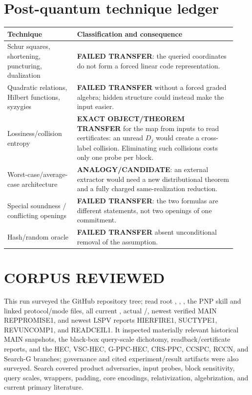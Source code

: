 \documentclass[11pt]{article}
\begin{document}
\section{Post-quantum technique ledger}
\begin{longtable}{p{0.29\linewidth}p{0.64\linewidth}}
\toprule Technique & Classification and consequence\\ \midrule\endhead
Schur squares, shortening, puncturing, dualization & \textbf{FAILED TRANSFER}:
the queried coordinates do not form a forced linear code representation.\\
Quadratic relations, Hilbert functions, syzygies & \textbf{FAILED TRANSFER}
without a forced graded algebra; hidden structure could instead make the
input easier.\\
Lossiness/collision entropy & \textbf{EXACT OBJECT/THEOREM TRANSFER} for the
map from inputs to read certificates: an unread \(D_j\) would create a
cross-label collision.  Eliminating such collisions costs only one probe per
block.\\
Worst-case/average-case architecture & \textbf{ANALOGY/CANDIDATE}: an external
extractor would need a new distributional theorem and a fully charged
same-realization reduction.\\
Special soundness / conflicting openings & \textbf{FAILED TRANSFER}: the two
formulas are different statements, not two openings of one commitment.\\
Hash/random oracle & \textbf{FAILED TRANSFER} absent unconditional removal of
the assumption.\\ \bottomrule
\end{longtable}

\section{CORPUS REVIEWED}
This run surveyed the GitHub repository tree; read root ,
, , the PNP skill and linked protocol/mode
files, all current , actual /,
newest verified MAIN REPPROMISE1, and newest LSPV reports HIERFIRE1, SUCTYPE1,
REVUNCOMP1, and READCEIL1.  It inspected materially relevant historical MAIN
snapshots, the black-box query-scale dichotomy, readback/certificate reports,
and the HEC, VSC-HEC, G-PPC-HEC, CRS-PPC, CCSPC, RCCN, and Search-G branches;
governance and cited experiment/result artifacts were also surveyed.  Search
covered product adversaries, input probes, block sensitivity, query scales,
wrappers, padding, core encodings, relativization, algebrization, and current
primary literature.
\end{document}
